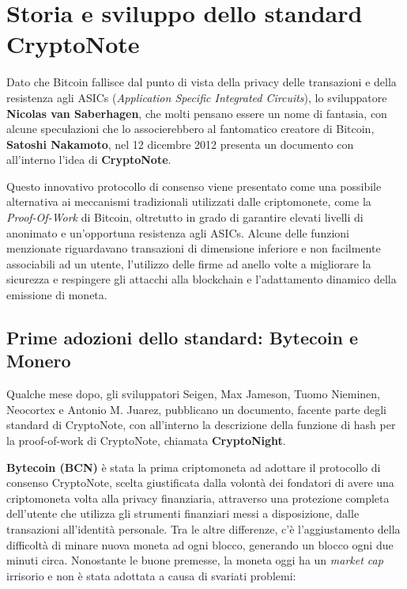 \section{Storia e sviluppo dello standard CryptoNote}\label{inizio-dello-sviluppo-e-storia-dellalgoritmo}
Dato che Bitcoin fallisce dal punto di vista della privacy delle
transazioni e della resistenza agli ASICs (\emph{Application Specific
Integrated Circuits}), lo sviluppatore \textbf{Nicolas van Saberhagen},
che molti pensano essere un nome di fantasia, con alcune speculazioni
che lo associerebbero al fantomatico creatore di Bitcoin,
\textbf{Satoshi Nakamoto}, nel 12 dicembre 2012 presenta un documento
con all'interno l'idea di \textbf{CryptoNote}.

Questo innovativo protocollo di consenso viene presentato come una
possibile alternativa ai meccanismi tradizionali utilizzati dalle
criptomonete, come la \emph{Proof-Of-Work} di Bitcoin, oltretutto in grado di garantire
elevati livelli di anonimato e un'opportuna resistenza agli ASICs.
Alcune delle funzioni menzionate riguardavano transazioni di dimensione
inferiore e non facilmente associabili ad un utente, l'utilizzo delle
firme ad anello volte a migliorare la sicurezza e respingere gli
attacchi alla blockchain e l'adattamento dinamico della emissione di
moneta.

\subsection{Prime adozioni dello standard: Bytecoin e Monero}\label{sviluppo-dello-standard-cryptonight-e-adozione}
Qualche mese dopo, gli sviluppatori Seigen, Max Jameson, Tuomo Nieminen,
Neocortex e Antonio M. Juarez, pubblicano un documento, facente parte
degli standard di CryptoNote, con all'interno la descrizione della
funzione di hash per la proof-of-work di CryptoNote, chiamata
\textbf{CryptoNight}.

\textbf{Bytecoin (BCN)} è stata la prima criptomoneta ad adottare il
protocollo di consenso CryptoNote, scelta giustificata dalla volontà dei
fondatori di avere una criptomoneta volta alla privacy finanziaria,
attraverso una protezione completa dell'utente che utilizza gli
strumenti finanziari messi a disposizione, dalle transazioni
all'identità personale. Tra le altre differenze, c'è l'aggiustamento
della difficoltà di minare nuova moneta ad ogni blocco, generando un
blocco ogni due minuti circa. Nonostante le buone premesse, la moneta
oggi ha un \emph{market cap} irrisorio e non è stata adottata a causa di
svariati problemi:

